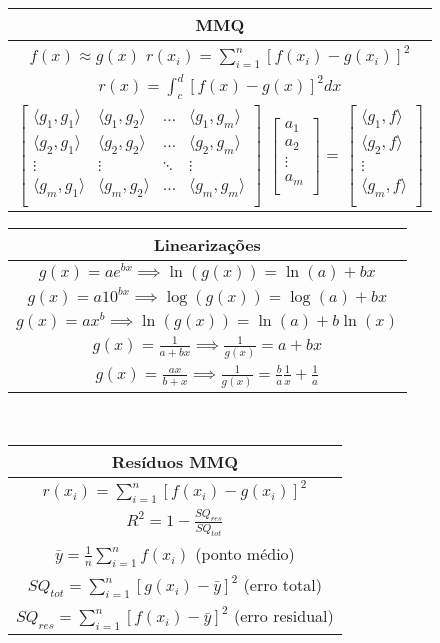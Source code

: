 \documentclass{article}
\begin{document}
\begin{tabular}{c}
MMQ\\
\hline
$f(x) \approx g(x)$
$r(x_i) = \sum_{i=1}^{n} [f(x_i) - g(x_i) ]^2$ \\
$r(x) = \int_c^d [f(x)-g(x)]^2 dx$\\
\hline
$\begin{bmatrix}
\langle g_1,g_1 \rangle & \langle g_1,g_2 \rangle & \hdots & \langle g_1,g_m \rangle \\
\langle g_2,g_1 \rangle & \langle g_2,g_2 \rangle & \hdots & \langle g_2,g_m \rangle \\
\vdots & \vdots & \ddots & \vdots \\
\langle g_m,g_1 \rangle & \langle g_m,g_2 \rangle & \hdots & \langle g_m,g_m \rangle \\
\end{bmatrix}$
$\begin{bmatrix}
a_1 \\
a_2 \\
\vdots \\
a_m \\
\end{bmatrix}$
= $\begin{bmatrix}
\langle g_1,f \rangle \\
\langle g_2,f \rangle \\
\vdots \\
\langle g_m,f \rangle \\
\end{bmatrix}$\\
\hline
\end{tabular}
\begin{tabular}{c}
Linearizações\\
\hline
$g(x) = ae^{bx} \implies \ln(g(x)) = \ln(a) + bx$\\
$g(x) = a10^{bx} \implies \log(g(x))= \log(a) + bx$\\
$g(x) = ax^b \implies \ln(g(x)) = \ln(a) + b\ln(x)$\\
$g(x) = \frac{1}{a+bx} \implies \frac{1}{g(x)} = a + bx$\\
$g(x) = \frac{ax}{b+x} \implies \frac{1}{g(x)} = \frac{b}{a}\frac{1}{x} + \frac{1}{a}$\\
\end{tabular}\\
\begin{tabular}{c}
Resíduos MMQ\\
\hline
$r(x_i) = \displaystyle\sum_{i=1}^{n} [f(x_i) - g(x_i) ]^2$ \\
$R^2 = 1 - \frac{SQ_{res}}{SQ_{tot}}$\\
$\bar{y} = \frac{1}{n}\displaystyle\sum_{i=1}^{n}f(x_i)$ (ponto médio) \\
$SQ_{tot} = \displaystyle\sum_{i=1}^{n} [g(x_i) - \bar{y}]^2$ (erro total) \\
$SQ_{res} = \displaystyle\sum_{i=1}^{n} [f(x_i) - \bar{y}]^2$ (erro residual) \\
\end{tabular}	
\end{document}
